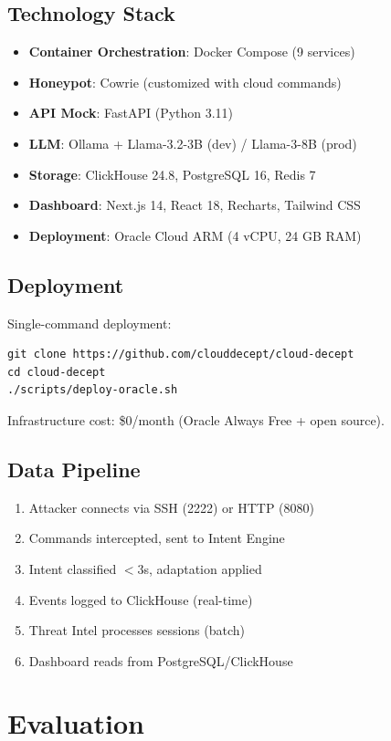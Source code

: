 \documentclass[10pt,conference]{IEEEtran}
\begin{document}
\subsection{Technology Stack}
\begin{itemize}
    \item \textbf{Container Orchestration}: Docker Compose (9 services)
    \item \textbf{Honeypot}: Cowrie (customized with cloud commands)
    \item \textbf{API Mock}: FastAPI (Python 3.11)
    \item \textbf{LLM}: Ollama + Llama-3.2-3B (dev) / Llama-3-8B (prod)
    \item \textbf{Storage}: ClickHouse 24.8, PostgreSQL 16, Redis 7
    \item \textbf{Dashboard}: Next.js 14, React 18, Recharts, Tailwind CSS
    \item \textbf{Deployment}: Oracle Cloud ARM (4 vCPU, 24 GB RAM)
\end{itemize}

\subsection{Deployment}
Single-command deployment:
\begin{verbatim}
git clone https://github.com/clouddecept/cloud-decept
cd cloud-decept
./scripts/deploy-oracle.sh
\end{verbatim}

Infrastructure cost: \$0/month (Oracle Always Free + open source).

\subsection{Data Pipeline}
\begin{enumerate}
    \item Attacker connects via SSH (2222) or HTTP (8080)
    \item Commands intercepted, sent to Intent Engine
    \item Intent classified $<3$s, adaptation applied
    \item Events logged to ClickHouse (real-time)
    \item Threat Intel processes sessions (batch)
    \item Dashboard reads from PostgreSQL/ClickHouse
\end{enumerate}

\section{Evaluation}
\label{sec:eval}
\end{document}
